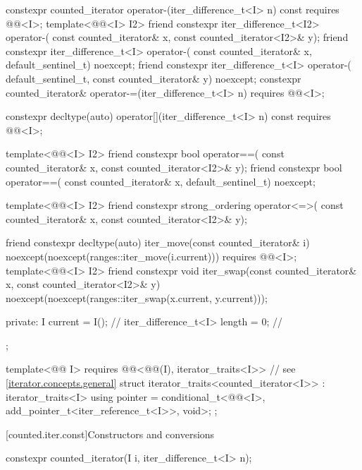 \begin{codeblock}
{{    constexpr counted_iterator operator-(iter_difference_t<I> n) const
      requires @@<I>;
    template<@@<I> I2>
      friend constexpr iter_difference_t<I2> operator-(
        const counted_iterator& x, const counted_iterator<I2>& y);
    friend constexpr iter_difference_t<I> operator-(
      const counted_iterator& x, default_sentinel_t) noexcept;
    friend constexpr iter_difference_t<I> operator-(
      default_sentinel_t, const counted_iterator& y) noexcept;
    constexpr counted_iterator& operator-=(iter_difference_t<I> n)
      requires @@<I>;

    constexpr decltype(auto) operator[](iter_difference_t<I> n) const
      requires @@<I>;

    template<@@<I> I2>
      friend constexpr bool operator==(
        const counted_iterator& x, const counted_iterator<I2>& y);
    friend constexpr bool operator==(
      const counted_iterator& x, default_sentinel_t) noexcept;

    template<@@<I> I2>
      friend constexpr strong_ordering operator<=>(
        const counted_iterator& x, const counted_iterator<I2>& y);

    friend constexpr decltype(auto) iter_move(const counted_iterator& i)
      noexcept(noexcept(ranges::iter_move(i.current)))
        requires @@<I>;
    template<@@<I> I2>
      friend constexpr void iter_swap(const counted_iterator& x, const counted_iterator<I2>& y)
        noexcept(noexcept(ranges::iter_swap(x.current, y.current)));

  private:
    I current = I();                    // \expos
    iter_difference_t<I> length = 0;    // \expos
  };

  template<@@ I>
    requires @@<@@(I), iterator_traits<I>>   // see \ref{iterator.concepts.general}
  struct iterator_traits<counted_iterator<I>> : iterator_traits<I> {
    using pointer = conditional_t<@@<I>,
                                  add_pointer_t<iter_reference_t<I>>, void>;
  };
}
\end{codeblock}

[counted.iter.const]{Constructors and conversions}

%
\begin{itemdecl}
constexpr counted_iterator(I i, iter_difference_t<I> n);
\end{itemdecl}


